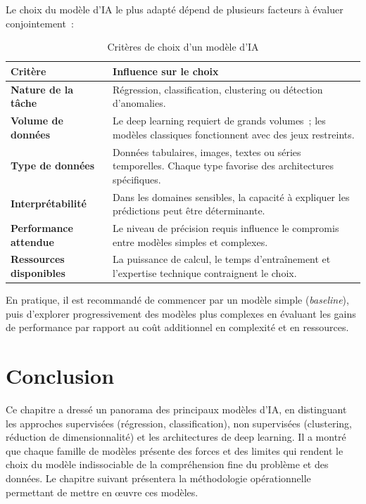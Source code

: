Le choix du modèle d'IA le plus adapté dépend de plusieurs facteurs à évaluer conjointement~:

\begin{table}[H]
\centering
\caption{Critères de choix d'un modèle d'IA}
\label{tab:criteres-choix}
\renewcommand{\arraystretch}{1.4}
\begin{tabularx}{\textwidth}{|>{\bfseries}p{3cm}|X|}
\hline
\rowcolor{TableHeader}\textbf{Critère} & \textbf{Influence sur le choix} \\
\hline
Nature de la tâche & Régression, classification, clustering ou détection d'anomalies. \\
\hline
Volume de données & Le deep learning requiert de grands volumes~; les modèles classiques fonctionnent avec des jeux restreints. \\
\hline
Type de données & Données tabulaires, images, textes ou séries temporelles. Chaque type favorise des architectures spécifiques. \\
\hline
Interprétabilité & Dans les domaines sensibles, la capacité à expliquer les prédictions peut être déterminante. \\
\hline
Performance attendue & Le niveau de précision requis influence le compromis entre modèles simples et complexes. \\
\hline
Ressources disponibles & La puissance de calcul, le temps d'entraînement et l'expertise technique contraignent le choix. \\
\hline
\end{tabularx}
\end{table}

En pratique, il est recommandé de commencer par un modèle simple (\textit{baseline}), puis d'explorer progressivement des modèles plus complexes en évaluant les gains de performance par rapport au coût additionnel en complexité et en ressources.

\section{Conclusion}

Ce chapitre a dressé un panorama des principaux modèles d'IA, en distinguant les approches supervisées (régression, classification), non supervisées (clustering, réduction de dimensionnalité) et les architectures de deep learning. Il a montré que chaque famille de modèles présente des forces et des limites qui rendent le choix du modèle indissociable de la compréhension fine du problème et des données. Le chapitre suivant présentera la méthodologie opérationnelle permettant de mettre en \oe{}uvre ces modèles.

\newpage
